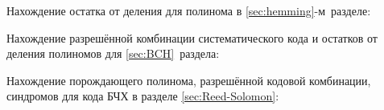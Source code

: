 \newpage
{} 
\label{sec:octave}

Нахождение остатка от деления для полинома в
\ref{sec:hemming}-м~разделе:  
\label{page1}


Нахождение разрешённой комбинации систематического кода и остатков от
деления полиномов для \ref{sec:BCH}~раздела:
\label{page2}
 

Нахождение порождающего полинома, разрешённой кодовой комбинации,
синдромов для кода БЧХ в разделе \ref{sec:Reed-Solomon}:
\label{page3}

 \newpage



